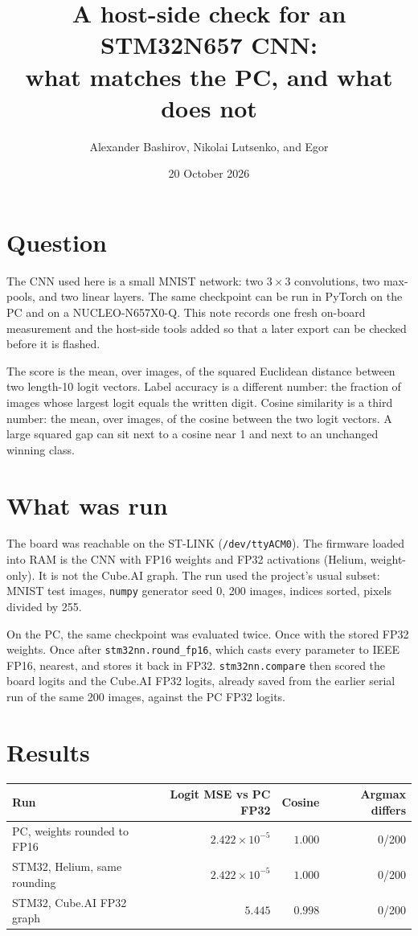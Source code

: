 \documentclass[11pt]{article}
\title{A host-side check for an STM32N657 CNN:\\
what matches the PC, and what does not}
\author{Alexander Bashirov, Nikolai Lutsenko, and Egor}
\date{20 October 2026}
\begin{document}
\maketitle

\section{Question}
The CNN used here is a small MNIST network: two \(3\times 3\) convolutions, two max-pools, and two linear layers. The same checkpoint can be run in PyTorch on the PC and on a NUCLEO-N657X0-Q. This note records one fresh on-board measurement and the host-side tools added so that a later export can be checked before it is flashed.

The score is the mean, over images, of the squared Euclidean distance between two length-10 logit vectors. Label accuracy is a different number: the fraction of images whose largest logit equals the written digit. Cosine similarity is a third number: the mean, over images, of the cosine between the two logit vectors. A large squared gap can sit next to a cosine near 1 and next to an unchanged winning class.

\section{What was run}
The board was reachable on the ST-LINK (\texttt{/dev/ttyACM0}). The firmware loaded into RAM is the CNN with FP16 weights and FP32 activations (Helium, weight-only). It is not the Cube.AI graph. The run used the project's usual subset: MNIST test images, \texttt{numpy} generator seed 0, 200 images, indices sorted, pixels divided by 255.

On the PC, the same checkpoint was evaluated twice. Once with the stored FP32 weights. Once after \texttt{stm32nn.round\_fp16}, which casts every parameter to IEEE FP16, nearest, and stores it back in FP32. \texttt{stm32nn.compare} then scored the board logits and the Cube.AI FP32 logits, already saved from the earlier serial run of the same 200 images, against the PC FP32 logits.

\section{Results}
\label{sec:results}

\begin{center}
\begin{tabular}{lrrr}
\toprule
Run & Logit MSE vs PC FP32 & Cosine & Argmax differs \\
\midrule
PC, weights rounded to FP16 & \(2.422\times 10^{-5}\) & \(1.000\) & 0/200 \\
STM32, Helium, same rounding & \(2.422\times 10^{-5}\) & \(1.000\) & 0/200 \\
STM32, Cube.AI FP32 graph & \(5.445\) & \(0.998\) & 0/200 \\
\bottomrule
\end{tabular}
\end{center}
\end{document}
